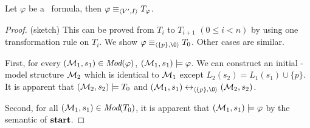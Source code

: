 \documentclass{article}
\begin{document}
\begin{proposition}\label{pro:TranE}
 Let $\varphi$ be a \CTL\ formula, then $\varphi \equiv_{{\langle{V', I}\rangle}} T_{\varphi}$.
\end{proposition}
\begin{proof} (sketch)
This can be proved from $T_i$ to $T_{i+1}$ $(0\leq i < n)$ by using one transformation rule on $T_i$.
We show $\varphi \equiv_{\tuple{\{p\}, {\O}}} T_0$.  Other cases are similar.

First, for every $({\cal M}_1,s_1) \in \textit{Mod}(\varphi)$, \ie $({\cal M}_1,s_1) \models \varphi$. We can construct an initial \Ind-model structure ${\cal M}_2$ which is identical to ${\cal M}_1$ except $L_2(s_2) = L_1(s_1) \cup \{p\}$. It is apparent that $({\cal M}_2,s_2) \models T_0$ and $(\Hm_1, s_1) \lrto_{\tuple{\{p\}, {\O}}} (\Hm_2, s_2)$.

Second, for all $({\cal M}_1,s_1) \in \textit{Mod}(T_0)$, it is apparent that $({\cal M}_1,s_1) \models \varphi$ by the semantic of $\textbf{start}$.

%


\end{proof}
\end{document}
